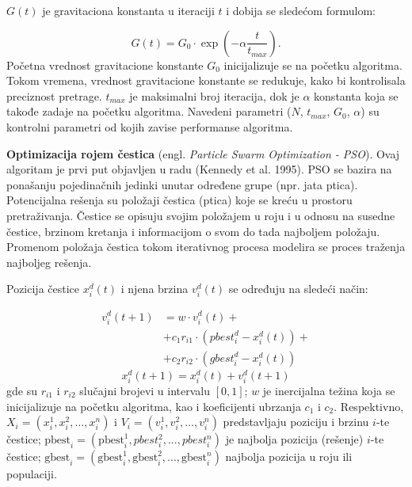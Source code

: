 $G(t)$ je gravitaciona konstanta u iteraciji $t$ i dobija se sledećom formulom:

\begin{equation}
    G(t) = G_0 \cdot \exp \left(- \alpha \frac{t}{t_{max}} \right).
\end{equation}
Početna vrednost gravitacione konstante $G_0$ inicijalizuje se na početku algoritma. Tokom vremena, vrednost gravitacione konstante se redukuje, kako bi kontrolisala preciznost pretrage. $t_{max}$ je maksimalni broj iteracija, dok je $\alpha$ konstanta koja se takođe zadaje na početku algoritma. Navedeni parametri ($N$, $t_{max}$, $G_0$, $\alpha$) su kontrolni parametri od kojih zavise performanse algoritma.

\textbf{Optimizacija rojem čestica} (engl. \emph{Particle Swarm Optimization - PSO}). Ovaj algoritam je prvi put objavljen u radu (Kennedy et al. 1995). PSO se bazira na ponašanju pojedinačnih jedinki unutar određene grupe (npr. jata ptica). Potencijalna rešenja su položaji čestica (ptica) koje se kreću u prostoru pretraživanja. Čestice se opisuju svojim položajem u roju i u odnosu na susedne čestice, brzinom kretanja i informacijom o svom do tada najboljem položaju. Promenom položaja čestica tokom iterativnog procesa modelira se proces traženja najboljeg rešenja. 

Pozicija čestice $x_i^d(t)$ i njena brzina $v_i^d(t)$ se određuju na sledeći način:

\begin{align}
    v_i^d(t+1) & = w \cdot v_i^d(t) + \nonumber \\
    & + c_1 r_{i1} \cdot (\text{}pbest_i^d-x_i^d(t)) + \nonumber \\ 
    & + c_2 r_{i2} \cdot (\text{}gbest_i^d-x_i^d(t))
\end{align}
\begin{equation}
    x_i^d(t+1) = x_i^d(t) + v_i^d(t + 1)
\end{equation}
gde su $r_{i1}$ i $r_{i2}$ slučajni brojevi u intervalu $[0,1]$; $w$ je inercijalna težina koja se inicijalizuje na početku algoritma, kao i koeficijenti ubrzanja $c_1$ i $c_2$. Respektivno, $X_i =(x_i^1, x_i^2, \dots , x_i^n)$ i $V_i =(v_i^1, v_i^2, \dots , v_i^n)$ predstavljaju poziciju i brzinu $i$-te čestice; $\text{pbest}_i = (\text{pbest}_i^1,\text{}pbest_i^2,...,\text{}pbest_i^n)$ je najbolja pozicija (rešenje) $i$-te čestice; $\text{gbest}_i = (\text{gbest}_i^1,\text{gbest}_i^2,...,\text{gbest}_i^n)$ najbolja pozicija u roju ili populaciji.

